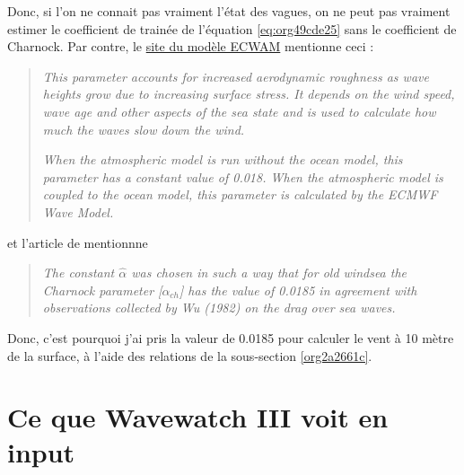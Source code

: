 \documentclass[10pt]{report}
\numberwithin{equation}{section}
\begin{document}
Donc, si l'on ne connait pas vraiment l'état des vagues, on ne peut pas vraiment estimer le coefficient de trainée de l'équation \ref{eq:org49cde25} sans le coefficient de Charnock.
Par contre, le \href{https://codes.ecmwf.int/grib/param-db/148}{site du modèle ECWAM} mentionne ceci :

\begin{quote}
\emph{This parameter accounts for increased aerodynamic roughness as wave heights grow due to increasing surface stress. It depends on the wind speed, wave age and other aspects of the sea state and is used to calculate how much the waves slow down the wind.}

\emph{When the atmospheric model is run without the ocean model, this parameter has a constant value of 0.018. When the atmospheric model is coupled to the ocean model, this parameter is calculated by the ECMWF Wave Model.}
\end{quote}

et l'article de \Textcite[p.163]{janssen2004interaction} mentionnne

\begin{quote}
\emph{The constant \(\hat{\alpha}\) was chosen in such a way
that for old windsea the Charnock parameter [\(\alpha_{ch}\)] has the value of 0.0185 in
agreement with observations collected by Wu (1982) on the drag over sea
waves.}
\end{quote}

Donc, c'est pourquoi j'ai pris la valeur de 0.0185 pour calculer le vent à 10 mètre de la surface, à l'aide des relations de la sous-section \ref{org2a2661c}.
\section{Ce que Wavewatch III voit en input}
\label{sec:orgae014d9}
\end{document}
